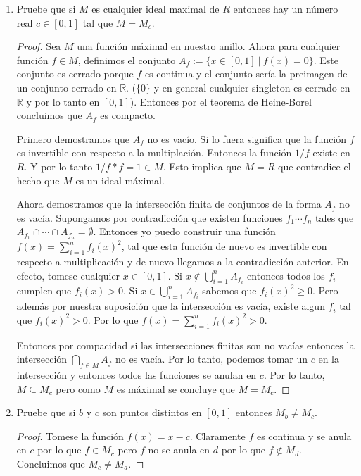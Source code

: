 \documentclass[letter,twoside,12pt]{article}
\begin{document}
\begin{enumerate}[label=\textbf{(\alph*)}]
\item Pruebe que si $M$ es cualquier ideal maximal de $R$ entonces hay un n\'umero real $c\in [0,1]$ tal que $M=M_c$.
\begin{proof}
Sea $M$ una funci\'on m\'aximal en nuestro anillo. Ahora para cualquier funci\'on $f \in M$, definimos el conjunto $A_f:=\{x\in[0,1]\:|\:f(x)=0\}$. Este conjunto es cerrado porque $f$ es continua y el conjunto ser\'ia la preimagen de un conjunto cerrado en $\mathbb{R}$. ($\{0\}$ y en general cualquier singleton es cerrado en $\mathbb{R}$ y por lo tanto en $[0,1]$). Entonces por el teorema de Heine-Borel concluimos que $A_f$ es compacto.

Primero demostramos que $A_f$ no es vac\'io. Si lo fuera significa que la funci\'on $f$ es invertible con respecto a la multiplaci\'on. Entonces la funci\'on $1/f$ existe en $R$. Y por lo tanto $1/f*f=1 \in M$. Esto implica que $M=R$ que contradice el hecho que $M$ es un ideal m\'aximal.

Ahora demostramos que la intersecci\'on finita de conjuntos de la forma $A_f$ no es vac\'ia. Supongamos por contradicci\'on que existen funciones $f_1 \cdots f_n$ tales que $A_{f_1}\cap \cdots \cap A_{f_n}= \emptyset$. Entonces yo puedo construir una funci\'on $f(x)= \sum_{i=1}^{n} f_i(x)^2$, tal que esta funci\'on de nuevo es invertible con respecto a multiplicaci\'on y de nuevo llegamos a la contradicci\'on anterior. En efecto, tomese cualquier $x \in [0,1]$. Si $x \not \in \bigcup_{i=1}^{n} A_{f_i}$ entonces todos los $f_i$ cumplen que $f_{i}(x)>0$. Si $x \in \bigcup_{i=1}^{n} A_{f_i}$ sabemos que $f_i(x)^2\geq 0$. Pero adem\'as por nuestra suposici\'on que la intersecci\'on es vac\'ia, existe algun $f_i$ tal que $f_i(x)^2>0$. Por lo que $f(x)= \sum_{i=1}^{n} f_i(x)^2>0$.

Entonces por compacidad si las intersecciones finitas son no vac\'ias entonces la intersecci\'on $\bigcap_{f \in M} A_f$ no es vac\'ia. Por lo tanto, podemos tomar un $c$ en la intersecci\'on y entonces todos las funciones se anulan en $c$. Por lo tanto, $M \subseteq M_c$ pero como $M$ es m\'aximal se concluye que $M=M_c$.
\end{proof}
\item Pruebe que si $b$ y $c$ son puntos distintos en $[0,1]$ entonces $M_b \not = M_c$.
\begin{proof}
Tomese la funci\'on $f(x)=x-c$. Claramente $f$ es continua y se anula en $c$ por lo que $f \in M_c$ pero $f$ no se anula en $d$ por lo que $f \not \in M_d$. Concluimos que $M_c \not = M_d$.
\end{proof}


\end{enumerate}
\end{document}
